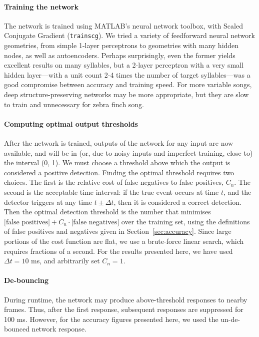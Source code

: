 \documentclass[10pt,letterpaper]{article}
\renewcommand{\subsubsection}[1]{\paragraph{#1}}
\begin{document}
\subsubsection{Training the network}

The network is trained using MATLAB's neural network toolbox, with Scaled Conjugate Gradient ({\tt trainscg}). We tried
a variety of feedforward neural network geometries, from simple
1-layer perceptrons to geometries with many hidden nodes, as well as
autoencoders. Perhaps surprisingly, even the former yields excellent
results on many syllables, but a 2-layer perceptron with a very small
hidden layer---with a unit count 2-4 times the number of target
syllables---was a good compromise between accuracy and training
speed. For more variable songs, deep structure-preserving networks may
be more appropriate, but they are slow to train and unnecessary for
zebra finch song.

\subsubsection{Computing optimal output thresholds}
\label{sec:optimalthresholds}
After the network is trained, outputs of the network for any input are
now available, and will be in (or, due to noisy inputs and imperfect
training, close to) the interval (0, 1). We must choose a threshold
above which the output is considered a positive detection. Finding the
optimal threshold requires two choices. The first is the relative cost
of false negatives to false positives, $C_n$. The second is the
acceptable time interval: if the true event occurs at time $t$, and
the detector triggers at any time $t\pm\Delta t$, then it is
considered a correct detection. Then the optimal detection threshold
is the number that minimises $\textrm{[false positives]}
+C_n\cdot\textrm{[false negatives]}$ over the training set, using the
definitions of false positives and negatives given in
Section~\ref{sec:accuracy}. Since large portions of the cost function
are flat, we use a brute-force linear search, which requires fractions of a
second. For the results presented here, we have used
$\Delta t=10$ ms, and arbitrarily set $C_n=1$.

\subsubsection{De-bouncing}

During runtime, the network may produce above-threshold responses to nearby
frames.  Thus, after the first response, subsequent responses are suppressed
for 100 ms.  However, for the accuracy figures presented here, we used
the un-de-bounced network response.
\end{document}

